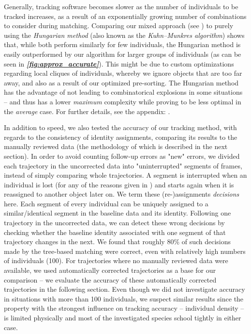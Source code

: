 \documentclass[9pt,lineno]{elife}
\newcommand{\figref}[1]{\textit{\textbf{\ref{#1}}}}
\begin{document}
Generally, tracking software becomes slower as the number of individuals to be tracked increases, as a result of an exponentially growing number of combinations to consider during matching. Comparing our mixed approach (see ) to purely using the \textit{Hungarian method} (also known as the \textit{Kuhn–Munkres algorithm}) shows that, while both perform similarly for few individuals, the Hungarian method is easily outperformed by our algorithm for larger groups of individuals (as can be seen in \figref{fig:approx_accurate}). This might be due to custom optimizations regarding local cliques of individuals, whereby we ignore objects that are too far away, and also as a result of our optimized pre-sorting. The Hungarian method has the advantage of not leading to combinatorical explosions in some situations -- and thus has a lower \textit{maximum} complexity while proving to be less optimal in the \textit{average} case. For further details, see the appendix: .

 \label{sec:evaluation_accuracy}
In addition to speed, we also tested the accuracy of our tracking method, with regards to the consistency of identity assignments, comparing its results to the manually reviewed data (the methodology of which is described in the next section). In order to avoid counting follow-up errors as "new" errors, we divided each trajectory in the uncorrected data into "uninterrupted" segments of frames, instead of simply comparing whole trajectories. A segment is interrupted when an individual is lost (for any of the reasons given in ) and starts again when it is reassigned to another object later on. We term these (re-)assignments \textit{decisions} here. Each segment of every individual can be uniquely assigned to a similar/identical segment in the baseline data and its identity. Following one trajectory in the uncorrected data, we can detect these wrong decisions by checking whether the baseline identity associated with one segment of that trajectory changes in the next. We found that roughly 80\% of such decisions made by the tree-based matching were correct, even with relatively high numbers of individuals (100). For trajectories where no manually reviewed data were available, we used automatically corrected trajectories as a base for our comparison -- we evaluate the accuracy of these automatically corrected trajectories in the following section. Even though we did not investigate accuracy in situations with more than 100 individuals, we suspect similar results since the property with the strongest influence on tracking accuracy -- individual density -- is limited physically and most of the investigated species school tightly in either case.
\end{document}
